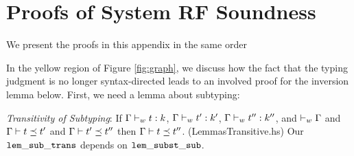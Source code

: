 \chapter{Proofs of System RF Soundness}
\label{ch:proofs}

We present the proofs in this appendix in the same order 

In the yellow region of Figure \ref{fig:graph}, we discuss how the fact that the typing judgment is no longer syntax-directed leads to an involved proof for the inversion lemma below. First, we need a lemma about subtyping:

\begin{lemma}
    {\em Transitivity of Subtyping}: If ${\mathrm{\Gamma}} \vdash_w {t} : {k}$, ${\mathrm{\Gamma}} \vdash_w {t'} : {k'}$, ${\mathrm{\Gamma}} \vdash_w {t''} : {k''}$, and $\vdash_w \mathrm{\Gamma}$ and ${\mathrm{\Gamma}} \vdash t \preceq t'$ and ${\mathrm{\Gamma}} \vdash t' \preceq t''$ then ${\mathrm{\Gamma}} \vdash t \preceq t''$. (LemmasTransitive.hs) Our ${\tt lem\_sub\_trans}$ depends on ${\tt lem\_subst\_sub}$.
\end{lemma}

